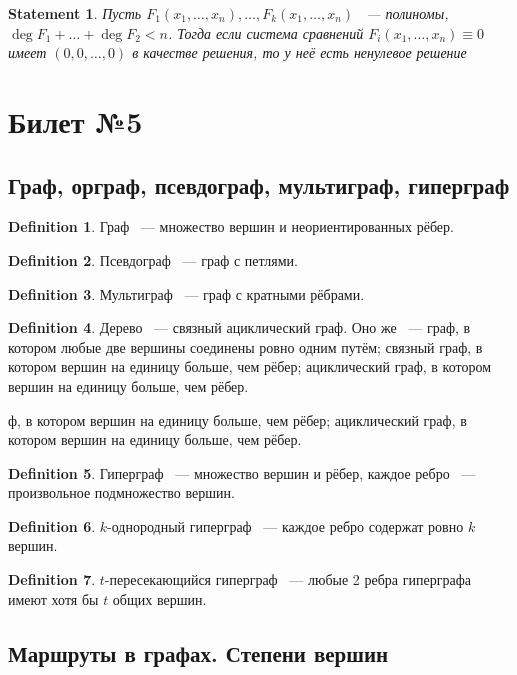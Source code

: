 \documentclass[a4paper]{article}
\theoremstyle{plain}
\newtheorem{statement}{Statement}
\theoremstyle{remark}
\theoremstyle{definition}
\newtheorem*{definition-star}{Definition}
\newcommand{\pars}[1]{\left( #1 \right)}
\begin{document}
\begin{statement}
	Пусть $F_1(x_1, \ldots, x_n), \ldots, F_k(x_1, \ldots, x_n)$ ~--- полиномы, $\deg F_1 + \ldots + \deg F_2 < n$. Тогда если система сравнений $F_i(x_1, \ldots, x_n) \equiv 0$ имеет $\pars{0,0,\ldots, 0}$ в качестве решения, то у неё есть ненулевое решение
\end{statement}

\section{Билет №5}
\subsection{Граф, орграф, псевдограф, мультиграф, гиперграф}
\begin{definition-star} Граф ~--- множество вершин и неориентированных рёбер.
\end{definition-star}
\begin{definition-star} Псевдограф ~--- граф с петлями.
\end{definition-star}
\begin{definition-star} Мультиграф ~--- граф с кратными рёбрами.
\end{definition-star}
\begin{definition-star} Дерево ~--- связный ациклический граф. Оно же ~--- граф, в котором любые две вершины соединены ровно одним путём; связный граф, в котором вершин на единицу больше, чем рёбер; ациклический граф,  в котором вершин на единицу больше, чем рёбер.
\end{definition-star}ф, в котором вершин на единицу больше, чем рёбер; ациклический граф,  в котором вершин на единицу больше, чем рёбер.
\begin{definition-star} Гиперграф ~--- множество вершин и рёбер,  каждое ребро ~--- произвольное подмножество вершин.
\end{definition-star}
\begin{definition-star} $k$-однородный гиперграф ~--- каждое ребро содержат ровно $k$ вершин.
\end{definition-star}
\begin{definition-star} $t$-пересекающийся гиперграф ~--- любые 2 ребра гиперграфа имеют хотя бы $t$ общих вершин.
\end{definition-star}

\subsection{Маршруты в графах. Степени вершин}
\end{document}
